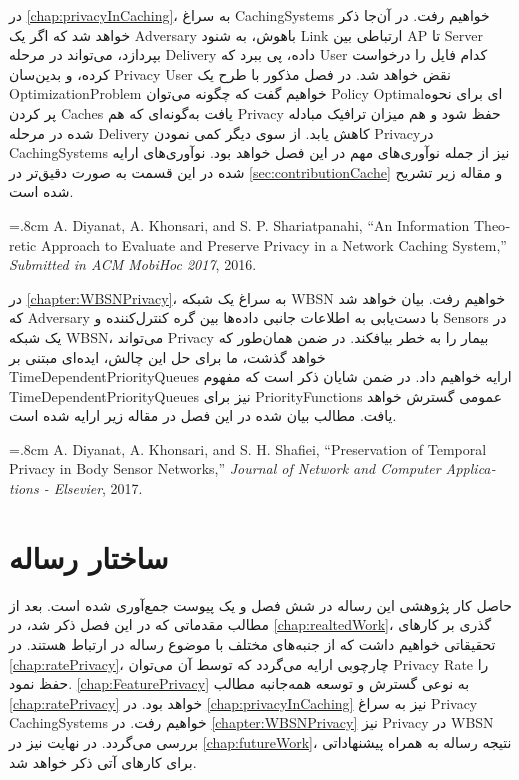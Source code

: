 \begin{itemize}
\begin{latin}
\end{latin}
\sci
در 
\autoref{chap:privacyInCaching}،
به سراغ 
\glspl{CachingSystem}
خواهیم رفت. در آن‌جا ذکر خواهد شد که اگر یک
\gls{Adversary}
باهوش، به شنود 
\gls{Link}
ارتباطی بین
\gls{AP} تا \gls{Server}
بپردازد، می‌تواند در مرحله
\gls{Delivery} داده،
پی ببرد که \gls{User} کدام فایل را درخواست کرده، و بدین‌سان
\gls{Privacy} \gls{User}
نقض خواهد شد. در فصل مذکور با طرح یک 
\gls{OptimizationProblem}
خواهیم گفت که چگونه می‌توان 
\gls{Policy} \gls{Optimal}ای برای نحوه پر کردن \glspl{Cache}
یافت به‌گونه‌ای که هم 
\gls{Privacy}
حفظ شود و هم میزان ترافیک مبادله شده در مرحله
\gls{Delivery}
کاهش یابد. از سوی دیگر کمی نمودن 
\gls{Privacy}‌در \glspl{CachingSystem}
نیز از جمله نوآوری‌های مهم در این فصل خواهد بود. نوآوری‌های ارایه شده در این قسمت به صورت دقیق‌تر در 
\autoref{sec:contributionCache} و مقاله زیر
تشریح شده است. 
\begin{latin}
\baselineskip=.8cm
A. Diyanat, A. Khonsari, and S. P. Shariatpanahi, “An Information Theoretic Approach to Evaluate and Preserve Privacy in a Network Caching System,” \textit{Submitted in ACM MobiHoc 2017}, 2016.
\end{latin}
\sci
در 
\autoref{chapter:WBSNPrivacy}،
به سراغ یک شبکه 
\gls{WBSN}
خواهیم رفت. بیان خواهد شد که 
\gls{Adversary}
با دست‌یابی به اطلاعات جانبی داده‌ها بین گره کنترل‌کننده و 
\glspl{Sensor} در یک شبکه \gls{WBSN}،
می‌تواند 
\gls{Privacy}
بیمار را به خطر بیافکند. در ضمن همان‌طور که خواهد گذشت، ما برای حل این چالش، ایده‌ای مبتنی بر 
\glspl{TimeDependentPriorityQueue}
ارایه خواهیم داد. در ضمن شایان ذکر است که مفهوم
\glspl{TimeDependentPriorityQueue}
نیز برای 
\glspl{PriorityFunction}
عمومی گسترش خواهد یافت. مطالب بیان شده در این فصل در مقاله زیر ارایه شده است. 
\begin{latin}
\baselineskip=.8cm
A. Diyanat, A. Khonsari, and S. H. Shafiei, “Preservation of Temporal Privacy in Body Sensor
Networks,” \textit{Journal of Network and Computer Applications - Elsevier}, 2017.
\end{latin}
\end{itemize}

\section{ساختار رساله}
\label{sec:structureResale}
حاصل کار پژوهشی این رساله در شش فصل و یک پیوست جمع‌آوری شده است. بعد از مطالب مقدماتی که در این فصل ذکر شد، در
\autoref{chap:realtedWork}،
گذری بر کارهای تحقیقاتی خواهیم داشت که از جنبه‌های مختلف با موضوع رساله در ارتباط هستند.  
در
\autoref{chap:ratePrivacy}،
چارچوبی ارایه می‌گردد که توسط آن می‌توان 
\gls{Privacy} \gls{Rate}
را حفظ نمود. 
\autoref{chap:FeaturePrivacy}
به نوعی گسترش و توسعه همه‌جانبه مطالب
\autoref{chap:ratePrivacy}
خواهد بود. در 
\autoref{chap:privacyInCaching}
نیز به سراغ 
\gls{Privacy} \glspl{CachingSystem}
خواهیم رفت. در 
\autoref{chapter:WBSNPrivacy} نیز \gls{Privacy} در \gls{WBSN}
بررسی می‌گردد. در نهایت نیز در 
\autoref{chap:futureWork}،
نتیجه رساله به همراه پیشنهاداتی برای کارهای آتی ذکر خواهد شد. 



